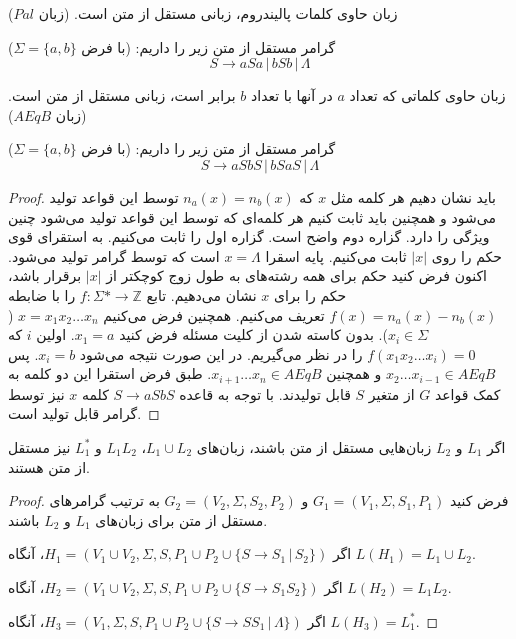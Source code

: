 \documentclass[main.tex]{subfiles}
\begin{document}
	\begin{example}
	زبان حاوی کلمات پالیندروم، زبانی مستقل از متن است. (زبان $ Pal $)
	
	گرامر مستقل از متن زیر را داریم: (با فرض 
	$\Sigma = \{a, b\}$)
	$$S \rightarrow aSa \, | \, bSb \, | \, \Lambda$$
	\end{example}

	\begin{example}
	زبان حاوی کلماتی که تعداد $a$ در آنها با تعداد $b$ برابر است، زبانی مستقل از متن است. (زبان $ AEqB $)
	
	گرامر مستقل از متن زیر را داریم: (با فرض 
	$\Sigma = \{a, b\}$)
	$$S \rightarrow aSbS \, | \, bSaS \, | \, \Lambda$$
	\begin{proof}
		باید نشان دهیم هر کلمه مثل $x$ که 
		$n_a(x) = n_b(x)$
	توسط این قواعد تولید می‌شود و همچنین باید ثابت کنیم هر کلمه‌ای که توسط این قواعد تولید می‌شود چنین ویژگی را دارد. گزاره دوم واضح است. گزاره اول را ثابت می‌کنیم. به استقرای قوی حکم را روی 
	$|x|$
	ثابت می‌کنیم. پایه اسقرا 
	$x = \Lambda$
	است که توسط گرامر تولید می‌شود. اکنون فرض کنید حکم برای همه رشته‌های به طول زوج کوچکتر از $|x|$ برقرار باشد، حکم را برای $x$ نشان می‌دهیم. تابع 
	$f : \Sigma* \rightarrow \mathbb{Z}$
	را با ضابطه 
	$f(x) = n_a(x) - n_b(x)$
	تعریف می‌کنیم. همچنین فرض می‌کنیم
	$x = x_1x_2\dots x_n$
	($x_i \in \Sigma$). 
	بدون کاسته شدن از کلیت مسئله فرض کنید $x_1 = a$. اولین $i$ که 
	$f(x_1x_2\dots x_i) = 0$
   را در نظر می‌گیریم. در این صورت نتیجه می‌شود $x_i = b$. پس 
   $x_2\dots x_{i-1} \in AEqB$
   و همچنین
   $x_{i+1}\dots x_n \in AEqB$. 
   طبق فرض استقرا این دو کلمه به کمک قواعد $G$ از متغیر $S$ قابل تولیدند. با توجه به قاعده 
   $S \rightarrow aSbS$
   کلمه $x$ نیز توسط گرامر قابل تولید است.
	\end{proof}
	\end{example}

	\begin{theorem}
		اگر $L_1$ و $L_2$ زبان‌هایی مستقل از متن باشند، زبان‌های
		$L_1 \cup L_2$،
		$L_1L_2$
		و
		$L_{1}^*$
		نیز مستقل از متن هستند.
	\end{theorem}

	\begin{proof}
		فرض کنید
		 $G_1 = (V_1, \Sigma, S_1, P_1)$ 
		و
		 $G_2 = (V_2, \Sigma, S_2, P_2)$ 
	به ترتیب گرامر‌های مستقل از متن برای زبان‌های $L_1$ و $L_2$ باشند.
	
	اگر 
		$H_1 = (V_1 \cup V_2, \Sigma, S, P_1 \cup P_2 \cup \{S \rightarrow S_1 \, | \, S_2 \})$،
		آنگاه
		$L(H_1) = L_1 \cup L_2$.
		
		
		اگر
		$H_2 = (V_1 \cup V_2, \Sigma, S, P_1 \cup P_2 \cup \{S \rightarrow S_1S_2 \})$،
		آنگاه
		$L(H_2) = L_1L_2$.
		
		
		اگر
		$H_3 = (V_1, \Sigma, S, P_1 \cup P_2 \cup \{S \rightarrow SS_1 \, | \, \Lambda\})$،
		آنگاه
		$L(H_3) = L_{1}^*$.
	\end{proof}
	
\end{document}
